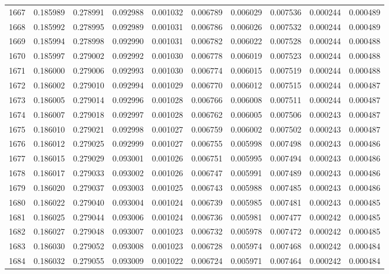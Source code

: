 \begin{tabular}{lrrrrrrrrr}
1667 & 0.185989 & 0.278991 & 0.092988 & 0.001032 & 0.006789 & 0.006029 & 0.007536 & 0.000244 & 0.000489 \\
1668 & 0.185992 & 0.278995 & 0.092989 & 0.001031 & 0.006786 & 0.006026 & 0.007532 & 0.000244 & 0.000489 \\
1669 & 0.185994 & 0.278998 & 0.092990 & 0.001031 & 0.006782 & 0.006022 & 0.007528 & 0.000244 & 0.000488 \\
1670 & 0.185997 & 0.279002 & 0.092992 & 0.001030 & 0.006778 & 0.006019 & 0.007523 & 0.000244 & 0.000488 \\
1671 & 0.186000 & 0.279006 & 0.092993 & 0.001030 & 0.006774 & 0.006015 & 0.007519 & 0.000244 & 0.000488 \\
1672 & 0.186002 & 0.279010 & 0.092994 & 0.001029 & 0.006770 & 0.006012 & 0.007515 & 0.000244 & 0.000487 \\
1673 & 0.186005 & 0.279014 & 0.092996 & 0.001028 & 0.006766 & 0.006008 & 0.007511 & 0.000244 & 0.000487 \\
1674 & 0.186007 & 0.279018 & 0.092997 & 0.001028 & 0.006762 & 0.006005 & 0.007506 & 0.000243 & 0.000487 \\
1675 & 0.186010 & 0.279021 & 0.092998 & 0.001027 & 0.006759 & 0.006002 & 0.007502 & 0.000243 & 0.000487 \\
1676 & 0.186012 & 0.279025 & 0.092999 & 0.001027 & 0.006755 & 0.005998 & 0.007498 & 0.000243 & 0.000486 \\
1677 & 0.186015 & 0.279029 & 0.093001 & 0.001026 & 0.006751 & 0.005995 & 0.007494 & 0.000243 & 0.000486 \\
1678 & 0.186017 & 0.279033 & 0.093002 & 0.001026 & 0.006747 & 0.005991 & 0.007489 & 0.000243 & 0.000486 \\
1679 & 0.186020 & 0.279037 & 0.093003 & 0.001025 & 0.006743 & 0.005988 & 0.007485 & 0.000243 & 0.000486 \\
1680 & 0.186022 & 0.279040 & 0.093004 & 0.001024 & 0.006739 & 0.005985 & 0.007481 & 0.000243 & 0.000485 \\
1681 & 0.186025 & 0.279044 & 0.093006 & 0.001024 & 0.006736 & 0.005981 & 0.007477 & 0.000242 & 0.000485 \\
1682 & 0.186027 & 0.279048 & 0.093007 & 0.001023 & 0.006732 & 0.005978 & 0.007472 & 0.000242 & 0.000485 \\
1683 & 0.186030 & 0.279052 & 0.093008 & 0.001023 & 0.006728 & 0.005974 & 0.007468 & 0.000242 & 0.000484 \\
1684 & 0.186032 & 0.279055 & 0.093009 & 0.001022 & 0.006724 & 0.005971 & 0.007464 & 0.000242 & 0.000484 \\

\end{tabular}
